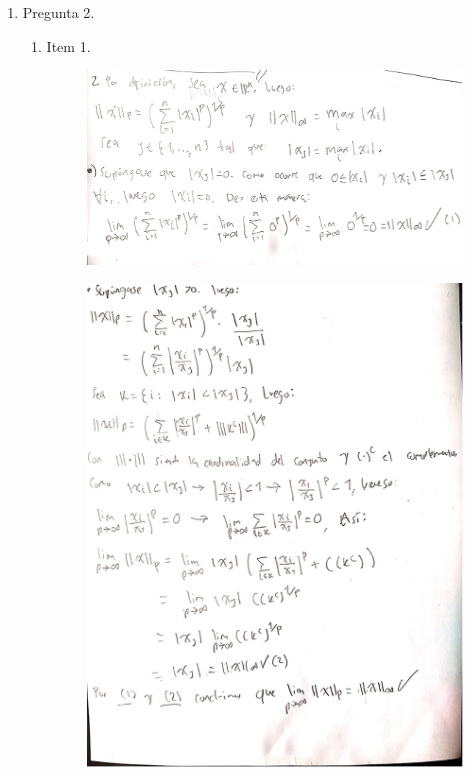 \documentclass[fleqn]{article}
\begin{document}
\begin{enumerate}
     \item Pregunta 2.
       \begin{enumerate}
         \item Item 1.
           \begin{figure}[H]
             \centering \includegraphics[scale=.5]{figs/2a1}
           \end{figure}
           \begin{figure}[H]
             \centering \includegraphics[scale=.8]{figs/2a2}

\end{figure}
\end{enumerate}
\end{enumerate}
\end{document}
